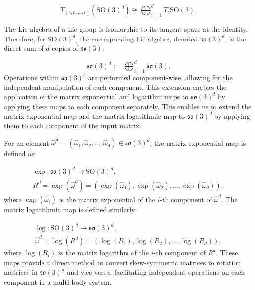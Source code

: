 \begin{equation}
    T_{(e, e, \dots, e)}(\mathrm{SO}(3)^d) \cong \bigoplus_{i=1}^d T_e \mathrm{SO}(3).
\end{equation}

The Lie algebra of a Lie group is isomorphic to its tangent space at the identity. Therefore, for \(\mathrm{SO}(3)^d\), the corresponding Lie algebra, denoted \(\mathfrak{so}(3)^d\), is the direct sum of \(d\) copies of \(\mathfrak{so}(3)\):

\begin{equation}
    \mathfrak{so}(3)^d := \bigoplus_{i=1}^d \mathfrak{so}(3).
\end{equation}
Operations within \(\mathfrak{so}(3)^d\) are performed component-wise, allowing for the independent manipulation of each component. This extension enables the application of the matrix exponential and logarithm maps to \(\mathfrak{so}(3)^d\) by applying these maps to each component separately. This enables us to extend the matrix exponential map and the matrix logarithmic map to \(\mathfrak{so}(3)^d\) by applying them to each component of the input matrix.

For an element \(\hat \omega^d = (\hat \omega_1, \hat \omega_2, \dots, \hat \omega_d) \in \mathfrak{so}(3)^d\), the matrix exponential map is defined as:

\begin{equation}
    \begin{aligned}
        \exp : \mathfrak{so}(3)^d \rightarrow \mathrm{SO}(3)^d, \\
        R^d = \exp(\hat \omega^d) = (\exp(\hat \omega_1), \exp(\hat \omega_2), \dots, \exp(\hat \omega_d)),
    \end{aligned}
    \label{eq:exp_SO3d}
\end{equation}
where \(\exp(\hat \omega_i)\) is the matrix exponential of the \(i\)-th component of \(\hat \omega^d\). The matrix logarithmic map is defined similarly:

\begin{equation}
    \begin{aligned}
        \log : \mathrm{SO}(3)^d \rightarrow \mathfrak{so}(3)^d, \\
        \hat \omega^d = \log(R^d) = (\log(R_1), \log(R_2), \dots, \log(R_d)),
    \end{aligned}
    \label{eq:log_SO3d}
\end{equation}
where \(\log(R_i)\) is the matrix logarithm of the \(i\)-th component of \(R^d\). These maps provide a direct method to convert skew-symmetric matrices to rotation matrices in \(\mathfrak{so}(3)^d\) and vice versa, facilitating independent operations on each component in a multi-body system.

